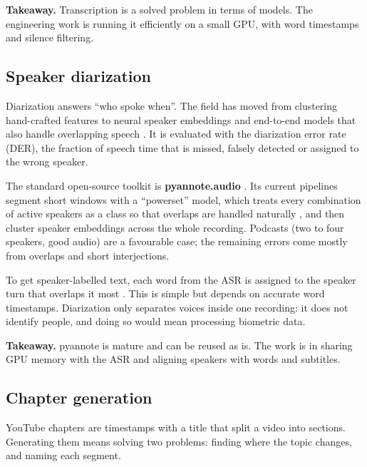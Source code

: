\documentclass[ENG]{TFUOC}
\begin{document}
\textbf{Takeaway.} Transcription is a solved problem in terms of models. The engineering work is running it efficiently on a small GPU, with word timestamps and silence filtering.

\subsection{Speaker diarization}
\label{ss:soa-diar}

Diarization answers ``who spoke when''. The field has moved from clustering hand-crafted features to neural speaker embeddings and end-to-end models that also handle overlapping speech \cite{park2022diarization}. It is evaluated with the diarization error rate (DER), the fraction of speech time that is missed, falsely detected or assigned to the wrong speaker.

The standard open-source toolkit is \textbf{pyannote.audio} \cite{bredin2020pyannote}. Its current pipelines segment short windows with a ``powerset'' model, which treats every combination of active speakers as a class so that overlaps are handled naturally \cite{plaquet2023powerset}, and then cluster speaker embeddings across the whole recording. Podcasts (two to four speakers, good audio) are a favourable case; the remaining errors come mostly from overlaps and short interjections.

To get speaker-labelled text, each word from the ASR is assigned to the speaker turn that overlaps it most \cite{bain2023whisperx}. This is simple but depends on accurate word timestamps. Diarization only separates voices inside one recording: it does not identify people, and doing so would mean processing biometric data.

\textbf{Takeaway.} pyannote is mature and can be reused as is. The work is in sharing GPU memory with the ASR and aligning speakers with words and subtitles.

\subsection{Chapter generation}
\label{ss:soa-chapters}

YouTube chapters are timestamps with a title that split a video into sections. Generating them means solving two problems: finding where the topic changes, and naming each segment.
\end{document}
